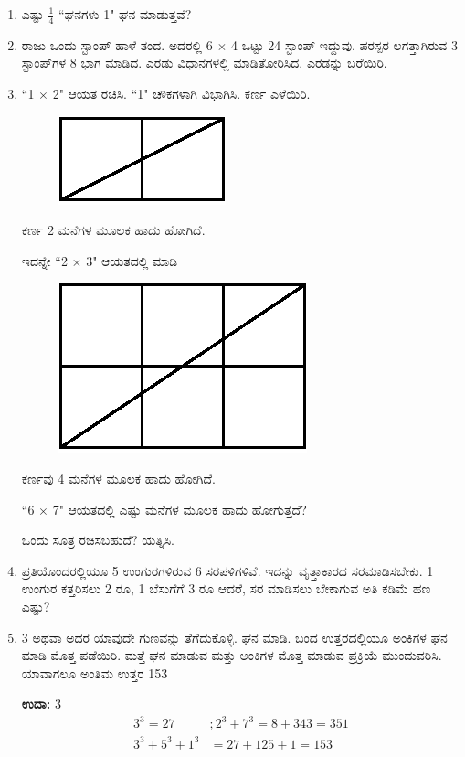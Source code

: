 \begin{enumerate}
\item ಎಷ್ಟು $\frac{1}{4}$ “ಘನಗಳು 1" ಘನ ಮಾಡುತ್ತವೆ?

\item ರಾಜು ಒಂದು ಸ್ಟಾಂಪ್ ಹಾಳೆ ತಂದ. ಅದರಲ್ಲಿ 6 $\times$ 4 ಒಟ್ಟು 24 ಸ್ಟಾಂಪ್ ಇದ್ದುವು. ಪರಸ್ಪರ ಲಗತ್ತಾಗಿರುವ 3 ಸ್ಟಾಂಪ್‌ಗಳ 8 ಭಾಗ ಮಾಡಿದ. ಎರಡು ವಿಧಾನಗಳಲ್ಲಿ ಮಾಡಿತೋರಿಸಿದ. ಎರಡನ್ನು ಬರೆಯಿರಿ.

\item “1 $\times$ 2" ಆಯತ ರಚಿಸಿ. “1" ಚೌಕಗಳಾಗಿ ವಿಭಾಗಿಸಿ. ಕರ್ಣ ಎಳೆಯಿರಿ. 
\begin{figure}[H]
\centering
\includegraphics{images/chap1/q25a.eps}
\end{figure}

ಕರ್ಣ 2 ಮನೆಗಳ ಮೂಲಕ ಹಾದು ಹೋಗಿದೆ.


ಇದನ್ನೇ “2 $\times$ 3" ಆಯತದಲ್ಲಿ ಮಾಡಿ 
\begin{figure}[H]
\centering
\includegraphics{images/chap1/q25b.eps}
\end{figure}

ಕರ್ಣವು 4 ಮನೆಗಳ ಮೂಲಕ ಹಾದು ಹೋಗಿದೆ. 


“6 $\times$ 7" ಆಯತದಲ್ಲಿ ಎಷ್ಟು ಮನೆಗಳ ಮೂಲಕ ಹಾದು ಹೋಗುತ್ತದೆ? 

ಒಂದು ಸೂತ್ರ ರಚಿಸಬಹುದೆ? ಯತ್ನಿಸಿ.

\item ಪ್ರತಿಯೊಂದರಲ್ಲಿಯೂ 5 ಉಂಗುರಗಳಿರುವ 6 ಸರಪಳಿಗಳಿವೆ. ಇದನ್ನು ವೃತ್ತಾಕಾರದ ಸರಮಾಡಿಸಬೇಕು. 1 ಉಂಗುರ ಕತ್ತರಿಸಲು 2 ರೂ, 1 ಬೆಸುಗೆಗೆ 3 ರೂ ಆದರೆ, ಸರ ಮಾಡಿಸಲು ಬೇಕಾಗುವ ಅತಿ ಕಡಿಮೆ ಹಣ ಎಷ್ಟು?

\item 3 ಅಥವಾ ಅದರ ಯಾವುದೇ ಗುಣವನ್ನು ತೆಗೆದುಕೊಳ್ಳಿ. ಘನ ಮಾಡಿ. ಬಂದ ಉತ್ತರದಲ್ಲಿಯೂ ಅಂಕಿಗಳ ಘನ ಮಾಡಿ ಮೊತ್ತ ಪಡೆಯಿರಿ. ಮತ್ತೆ ಘನ ಮಾಡುವ ಮತ್ತು ಅಂಕಿಗಳ ಮೊತ್ತ ಮಾಡುವ ಪ್ರಕ್ರಿಯೆ ಮುಂದುವರಿಸಿ. ಯಾವಾಗಲೂ ಅಂತಿಮ ಉತ್ತರ 153

{\bf ಉದಾ:} 3
\begin{align*}
 3^{3} = 27&; 2^{3} + 7^{3} = 8 + 343 = 351\\
3^{3} + 5^{3} + 1^{3} & = 27 + 125 + 1 = 153
\end{align*}


\end{enumerate}
